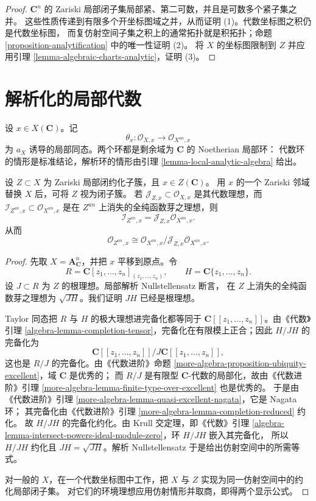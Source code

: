 \begin{proof}
$\mathbf C^n$ 的 Zariski 局部闭子集局部紧、第二可数，并且是可数多个紧子集之并。
这些性质传递到有限多个开坐标图域之并，从而证明 (1)。代数坐标图之积仍是代数坐标图，
而复仿射空间子集之积上的通常拓扑就是积拓扑；命题
\ref{proposition-analytification} 中的唯一性证明 (2)。
将 $X$ 的坐标图限制到 $Z$ 并应用引理 \ref{lemma-algebraic-charts-analytic}，证明 (3)。
\end{proof}

\section{解析化的局部代数}
\label{section-local-comparison}

\noindent
设 $x \in X(\mathbf C)$。记
$$
\theta_x : \mathcal O_{X,x} \longrightarrow \mathcal O_{X^{an},x}
$$
为 $a_X$ 诱导的局部同态。两个环都是剩余域为 $\mathbf C$ 的 Noetherian 局部环：
代数环的情形是标准结论，解析环的情形由引理 \ref{lemma-local-analytic-algebra} 给出。

\begin{proposition}
\label{proposition-analytification-closed-ideal}
设 $Z \subset X$ 为 Zariski 局部闭约化子簇，且 $x \in Z(\mathbf C)$。
用 $x$ 的一个 Zariski 邻域替换 $X$ 后，可将 $Z$ 视为闭子簇。
若 $\mathcal J_{Z,x} \subset \mathcal O_{X,x}$ 是其代数理想，而
$\mathcal I_{Z^{an},x} \subset \mathcal O_{X^{an},x}$ 是在 $Z^{an}$ 上消失的全纯函数芽之理想，则
$$
\mathcal I_{Z^{an},x} =
\mathcal J_{Z,x}\mathcal O_{X^{an},x}.
$$
从而
$$
\mathcal O_{Z^{an},x} \cong
\mathcal O_{X^{an},x}/
\mathcal J_{Z,x}\mathcal O_{X^{an},x}.
$$
\end{proposition}

\begin{proof}
先取 $X=\mathbf A^n_{\mathbf C}$，并把 $x$ 平移到原点。令
$$
R=\mathbf C[z_1,\ldots,z_n]_{(z_1,\ldots,z_n)},
\qquad
H=\mathbf C\{z_1,\ldots,z_n\}.
$$
设 $J \subset R$ 为 $Z$ 的根理想。局部解析 Nullstellensatz 断言，
在 $Z$ 上消失的全纯函数芽之理想为 $\sqrt{JH}$。我们证明 $JH$ 已经是根理想。

Taylor 同态把 $R$ 与 $H$ 的极大理想进完备化都等同于
$\mathbf C[[z_1,\ldots,z_n]]$。由《代数》引理
\ref{algebra-lemma-completion-tensor}，完备化在有限模上正合；因此 $H/JH$ 的完备化为
$$
\mathbf C[[z_1,\ldots,z_n]]/
J\mathbf C[[z_1,\ldots,z_n]],
$$
这也是 $R/J$ 的完备化。由《代数进阶》命题
\ref{more-algebra-proposition-ubiquity-excellent}，域 $\mathbf C$ 是优秀的；
而 $R/J$ 是有限型 $\mathbf C$-代数的局部化，故由《代数进阶》引理
\ref{more-algebra-lemma-finite-type-over-excellent} 也是优秀的。
于是由《代数进阶》引理 \ref{more-algebra-lemma-quasi-excellent-nagata}，它是 Nagata 环；
其完备化由《代数进阶》引理 \ref{more-algebra-lemma-completion-reduced} 约化。
故 $H/JH$ 的完备化约化。由 Krull 交定理，即《代数》引理
\ref{algebra-lemma-intersect-powers-ideal-module-zero}，环 $H/JH$ 嵌入其完备化，
所以 $H/JH$ 约化且 $JH=\sqrt{JH}$。解析 Nullstellensatz 于是给出仿射空间中的所需等式。

对一般的 $X$，在一个代数坐标图中工作，把 $X$ 与 $Z$ 实现为同一仿射空间中的约化局部闭子集。
对它们的环境理想应用仿射情形并取商，即得两个显示公式。
\end{proof}

